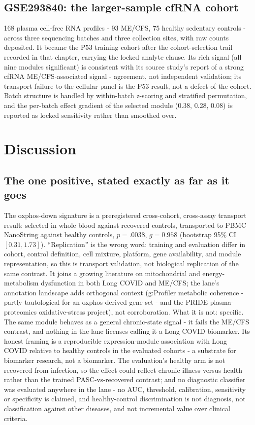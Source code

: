 \documentclass[11pt,a4paper]{article}
\begin{document}
\subsection{GSE293840: the larger-sample cfRNA cohort}
168 plasma cell-free RNA profiles - 93 ME/CFS, 75 healthy sedentary controls -
across three sequencing batches and three collection sites, with raw counts
deposited. It became the P53 training cohort after the cohort-selection trail
recorded in that chapter, carrying the locked analyte clause. Its rich signal
(all nine modules significant) is consistent with its source study's report
of a strong cfRNA ME/CFS-associated signal - agreement, not independent
validation; its transport failure to the
cellular panel is the P53 result, not a defect of the cohort. Batch structure
is handled by within-batch z-scoring and stratified permutation, and the
per-batch effect gradient of the selected module (0.38, 0.28, 0.08) is
reported as locked sensitivity rather than smoothed over.

\section{Discussion}
\subsection{The one positive, stated exactly as far as it goes}
The oxphos-down signature is a preregistered cross-cohort, cross-assay
transport result: selected in whole blood against recovered controls,
transported to PBMC NanoString against healthy controls, $p=.0038$,
$g=0.958$ (bootstrap 95\% CI $[0.31, 1.73]$). ``Replication'' is the wrong
word: training and evaluation differ in cohort, control definition, cell
mixture, platform, gene availability, and module representation, so this is
transport validation, not biological replication of the same contrast. It
joins a growing literature on mitochondrial and energy-metabolism
dysfunction in both Long COVID and ME/CFS; the lane's annotation landscape
adds orthogonal context (g:Profiler metabolic coherence - partly tautological
for an oxphos-derived gene set - and the PRIDE plasma-proteomics
oxidative-stress project), not corroboration. What it is not: specific. The
same module behaves as a general chronic-state signal - it fails the ME/CFS
contrast, and nothing in the lane licenses calling it a Long COVID biomarker.
Its honest framing is a reproducible expression-module association with Long
COVID relative to healthy controls in the evaluated cohorts - a substrate
for biomarker research, not a biomarker. The evaluation's healthy arm is not
recovered-from-infection, so the effect could reflect chronic illness versus
health rather than the trained PASC-vs-recovered contrast; and no diagnostic
classifier was evaluated anywhere in the lane - no AUC, threshold,
calibration, sensitivity or specificity is claimed, and healthy-control
discrimination is not diagnosis, not classification against other diseases,
and not incremental value over clinical criteria.
\end{document}
